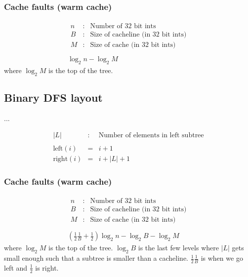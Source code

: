 \subsubsection*{Cache faults (warm cache)}

\begin{eqnarray*}
\begin{array}{rcl}
n & : & \textrm{Number of 32 bit ints} \\
B & : & \textrm{Size of cacheline (in 32 bit ints)} \\
M & : & \textrm{Size of cache (in 32 bit ints)}
\end{array}
\\
\\
\log_2 n - \log_2 M 
\end{eqnarray*}
where $\log_2 M$ is the top of the tree.


\subsection{Binary DFS layout}

...

\begin{eqnarray*}
|L| & : & \textrm{Number of elements in left subtree} \\
\\
\mathrm{left}(i) & = & i + 1 \\
\mathrm{right}(i) & = & i + |L| + 1
\end{eqnarray*}

\subsubsection*{Cache faults (warm cache)}

\begin{eqnarray*}
\begin{array}{rcl}
n & : & \textrm{Number of 32 bit ints} \\
B & : & \textrm{Size of cacheline (in 32 bit ints)} \\
M & : & \textrm{Size of cache (in 32 bit ints)}
\end{array}
\\
\\
(\frac{1}{2}\frac{1}{B} + \frac{1}{2})\log_2 n - \log_2 B - \log_2 M 
\end{eqnarray*}
where $\log_2 M$ is the top of the tree. $\log_2 B$ is the last few levels where $|L|$ gets small enough such that a subtree is smaller than a cacheline. $\frac{1}{2}\frac{1}{B}$ is when we go left and $\frac{1}{2}$ is right.

